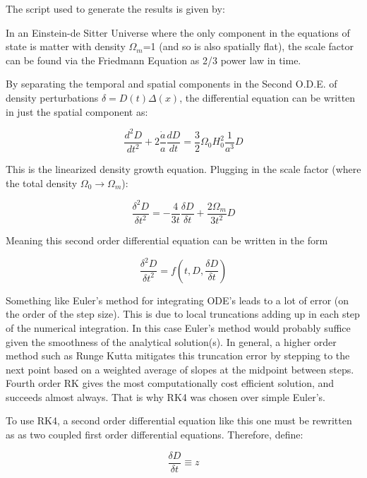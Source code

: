 The script used to generate the results is given by:



In an Einstein-de Sitter Universe where the only component in the equations of state is matter with density $\Omega_m$=1 (and so is also spatially flat), the scale factor can be found via the Friedmann Equation as 2/3 power law in time.

By separating the temporal and spatial components in the Second O.D.E. of density perturbations $\delta = D(t)\Delta(x)$, the differential equation can be written in just the spatial component as:

\begin{equation}
  \frac{d^2D}{dt^2}+2\frac{\dot{a}}{a}\frac{dD}{dt}=\frac{3}{2}\Omega_0H_0^2\frac{1}{a^3}D
\end{equation}

This is the linearized density growth equation. Plugging in the scale factor (where the total density $\Omega_0 \rightarrow \Omega_m$):

\begin{equation}
  \frac{\delta^2D}{\delta t^2}=-\frac{4}{3t}\frac{\delta D}{\delta t}+\frac{2\Omega_m}{3t^2}D
\end{equation}

Meaning this second order differential equation can be written in the form

\begin{equation}
  \frac{\delta^2D}{\delta t^2}=f\left(t,D,\frac{\delta D}{\delta t}\right)
\end{equation}

Something like Euler's method for integrating ODE's leads to a lot of error (on the order of the step size). This is due to local truncations adding up in each step of the numerical integration. In this case Euler's method would probably suffice given the smoothness of the analytical solution(s). In general, a higher order method such as Runge Kutta mitigates this truncation error by stepping to the next point based on a weighted average of slopes at the midpoint between steps. Fourth order RK gives the most computationally cost efficient solution, and succeeds almost always. That is why RK4 was chosen over simple Euler's.

To use RK4, a second order differential equation like this one must be rewritten as as two coupled first order differential equations. Therefore, define:

\begin{equation}
  \frac{\delta D}{\delta t} \equiv z
\end{equation}

